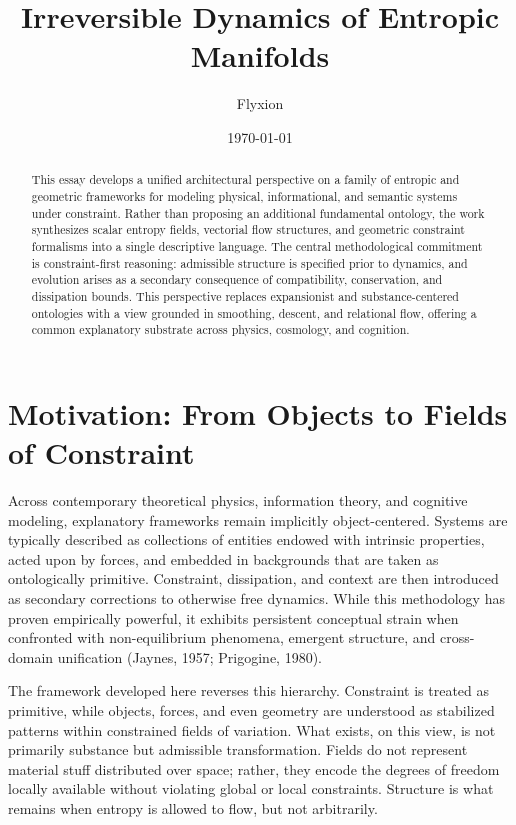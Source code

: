 \documentclass[11pt]{article}
\title{Irreversible Dynamics of Entropic Manifolds}
\author{Flyxion}
\date{\today}
\begin{document}
\maketitle

\begin{abstract}
This essay develops a unified architectural perspective on a family of entropic and geometric frameworks for modeling physical, informational, and semantic systems under constraint. Rather than proposing an additional fundamental ontology, the work synthesizes scalar entropy fields, vectorial flow structures, and geometric constraint formalisms into a single descriptive language. The central methodological commitment is constraint-first reasoning: admissible structure is specified prior to dynamics, and evolution arises as a secondary consequence of compatibility, conservation, and dissipation bounds. This perspective replaces expansionist and substance-centered ontologies with a view grounded in smoothing, descent, and relational flow, offering a common explanatory substrate across physics, cosmology, and cognition.
\end{abstract}

\section{Motivation: From Objects to Fields of Constraint}

Across contemporary theoretical physics, information theory, and cognitive modeling, explanatory frameworks remain implicitly object-centered. Systems are typically described as collections of entities endowed with intrinsic properties, acted upon by forces, and embedded in backgrounds that are taken as ontologically primitive. Constraint, dissipation, and context are then introduced as secondary corrections to otherwise free dynamics. While this methodology has proven empirically powerful, it exhibits persistent conceptual strain when confronted with non-equilibrium phenomena, emergent structure, and cross-domain unification (Jaynes, 1957; Prigogine, 1980).

The framework developed here reverses this hierarchy. Constraint is treated as primitive, while objects, forces, and even geometry are understood as stabilized patterns within constrained fields of variation. What exists, on this view, is not primarily substance but admissible transformation. Fields do not represent material stuff distributed over space; rather, they encode the degrees of freedom locally available without violating global or local constraints. Structure is what remains when entropy is allowed to flow, but not arbitrarily.
\end{document}
